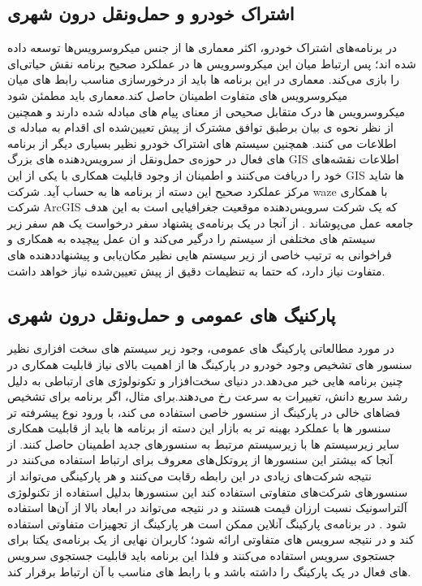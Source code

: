 \subsection{اشتراک خودرو و حمل‌و‌نقل درون شهری}
در برنامه‌ها‌ی اشتراک خودرو، اکثر معماری ها از جنس میکروسرویس‌ها توسعه داده شده اند؛ پس ارتباط میان این میکروسرویس ها در عملکرد صحیح برنامه نقش حیاتی‌ای را بازی می‌کند. معماری در این برنامه ها باید از درخورسازی مناسب رابط های میان میکروسرویس های متفاوت اطمینان حاصل کند.معماری باید مطمئن شود میکروسرویس ها درک متقابل صحیحی از معنای پیام های مبادله شده دارند و همچنین از نظر نحوه ی بیان برطبق توافق مشترک از پیش تعیین‌شده ای اقدام به مبادله ی اطلاعات می کنند. همچنین سیستم های اشتراک خودرو نظیر بسیاری دیگر از برنامه های فعال در حوزه‌ی حمل‌و‌نقل از سرویس‌دهنده های بزرگ‌ GIS اطلاعات نقشه‌های خود را دریافت می‌کنند و اطمینان از وجود قابلیت همکاری با یکی از این GIS ها شاید مرکز عملکرد صحیح این دسته از برنامه ها به حساب آید.
شرکت waze با همکاری شرکت ArcGIS که یک شرکت سرویس‌دهنده موقعیت جغرافیایی است به این هدف جامعه عمل می‌پوشاند \cite{waze_gis} .
از آنجا در یک برنامه‌ی پشنهاد سفر  درخواست یک هم سفر زیر سیستم های مختلفی از سیستم را درگیر می‌کند و ان عمل پیچیده به همکاری و فراخوانی به ترتیب خاصی از زیر سیستم هایی نظیر مکان‌یابی و پیشنهاددهنده های متفاوت نیاز دارد، که حتما به تنظیمات دقیق از پیش تعیین‌شده نیاز خواهد داشت.


\subsection{پارکنیگ های عمومی و حمل‌و‌نقل درون شهری}
در مورد مطالعاتی پارکینگ های عمومی، وجود زیر سیستم های سخت افزاری نظیر سنسور های تشخیص وجود خودرو در پارکینگ ها از اهمیت بالای نیاز قابلیت همکاری در چنین برنامه هایی خبر می‌دهد.در دنیای سخت‌افزار و تکونولوژی های ارتباطی به دلیل رشد سریع دانش، تغییرات به سرعت رخ می‌دهند.برای مثال، اگر برنامه برای تشخیص فضا‌های خالی در پارکینگ از سنسور خاصی استفاده می کند، با ورود نوع پیشرفته تر سنسور ها با عملکرد بهینه تر به بازار این دسته از برنامه ها باید از قابلیت همکاری سایر زیر‌سیستم ها با زیرسیستم مرتبط به سنسور‌های جدید اطمینان حاصل کنند.
از آنجا که بیشتر این سنسورها از پروتکل‌های معروف برای ارتباط استفاده می‌کنند در نتیجه شرکت‌های زیادی در این رابطه رقابت می‌کنند و هر پارکینگی می‌تواند از سنسورهای شرکت‌های متفاوتی استفاده کند این سنسور‌ها بدلیل استفاده از تکنولوژی آلتراسونیک نسبت ارزان قیمت هستند و در نتیجه می‌تواند در ابعاد بالا از آن‌ها استفاده شود \cite{parkwhiz_sensors} .
در برنامه‌ی پارکینگ آنلاین ممکن است هر پارکینگ از تجهیزات متفاوتی استفاده کند و در نتیجه سرویس های متفاوتی ارائه شود؛ کاربران نهایی از یک برنامه‌ی یکتا برای جستجوی سرویس استفاده می‌کنند و فلذا این برنامه باید قابلیت جستجوی سرویس های فعال در یک پارکینگ را داشته باشد و با رابط های مناسب با آن ارتباط برقرار کند.

